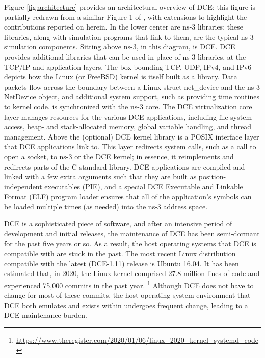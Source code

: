\documentclass{sig-alternate}
\begin{document}
Figure \ref{fig:architecture} provides an architectural overview of DCE;
this figure is partially redrawn from a similar Figure 1 of \cite{Tazaki13},
with extensions to highlight the contributions reported on herein.
In the lower center are ns-3 libraries; these libraries, along with simulation
programs that link to them, are the typical ns-3 simulation components.
Sitting above ns-3, in this diagram, is DCE.  DCE provides additional
libraries that can be used in place of ns-3 libraries, at the TCP/IP and
application layers.  The box bounding TCP, UDP, IPv4, and IPv6 depicts 
how the Linux (or FreeBSD) kernel is itself built as a library.  Data
packets flow across the boundary between a Linux struct net\_device and
the ns-3 NetDevice object, and additional system support, such as providing
time routines to kernel code, is synchronized with the ns-3 core.
The DCE virtualization core layer manages resources for the various DCE
applications, including file system access, heap- and stack-allocated
memory, global variable handling, and thread management.
Above the (optional) DCE kernel library is a POSIX interface layer that
DCE applications link to.  This layer redirects system calls, such as a
call to open a socket, to ns-3 or the DCE kernel; in essence, it reimplements
and redirects parts of the C standard library.  DCE applications are compiled
and linked with a few extra arguments such that they are built as 
position-independent executables (PIE), and a special DCE Executable and
Linkable Format (ELF) program loader
ensures that all of the application's symbols can be loaded multiple times
(as needed) into the ns-3 address space.

\sloppy DCE is a sophisticated piece of software, and after an intensive period
of development and initial releases, the maintenance of DCE has been
semi-dormant for the past five years or so.  As a result, the host
operating systems that DCE is compatible with are stuck in the past.
The most recent Linux distribution compatible with the latest (DCE-1.11)
release is Ubuntu 16.04.  It has been estimated
 that, in 2020, the Linux kernel comprised 27.8 million lines of code and
experienced 75,000 commits in the past year.  
\footnote{\url{https://www.theregister.com/2020/01/06/linux\_2020\_kernel\_systemd\_code}}
Although
DCE does not have to change for most of these commits, 
the host operating system environment that DCE both emulates and exists
within undergoes frequent change, leading to a DCE maintenance burden.
\end{document}
